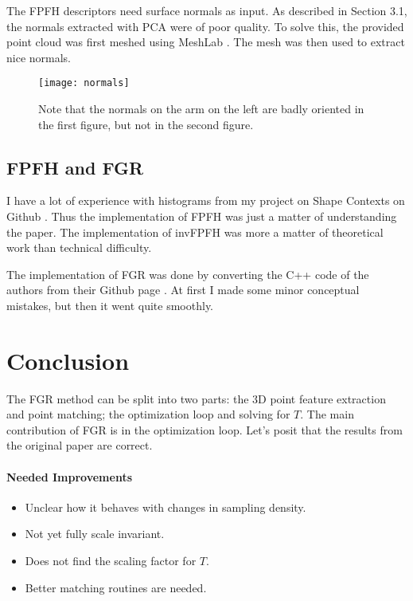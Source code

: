 \documentclass[10pt,a4paper]{article}
\begin{document}
The FPFH descriptors need surface normals as input. As described in Section 3.1, the normals extracted with PCA were of poor quality. To solve this, the provided point cloud was first meshed using MeshLab \cite{MeshLabS73:online}. The mesh was then used to extract nice normals. 

\begin{figure}[h!]
	\centering
	\centerline{
	\texttt{[image: normals]}}
	\caption{Note that the normals on the arm on the left are badly oriented in the first figure, but not in the second figure.}
	\label{fig:normals}
\end{figure}

\subsection{FPFH and FGR}

I have a lot of experience with histograms from my project on Shape Contexts on Github \cite{GitHubsz10:online}. Thus the implementation of FPFH was just a matter of understanding the paper. The implementation of invFPFH was more a matter of theoretical work than technical difficulty. 

The implementation of FGR was done by converting the C++ code of the authors from their Github page \cite{GitHubIn69:online}. At first I made some minor conceptual mistakes, but then it went quite smoothly. 

\newpage

\section{Conclusion}\label{sec5}

The FGR method can be split into two parts: the 3D point feature extraction and point matching; the optimization loop and solving for $T$. The main contribution of FGR is in the optimization loop. Let's posit that the results from the original paper are correct. 
\paragraph{Needed Improvements}
\begin{itemize}
	\item Unclear how it behaves with changes in sampling density. 
	\item Not yet fully scale invariant. 
	\item Does not find the scaling factor for $T$.
	\item Better matching routines are needed. 
\end{itemize}
\end{document}

